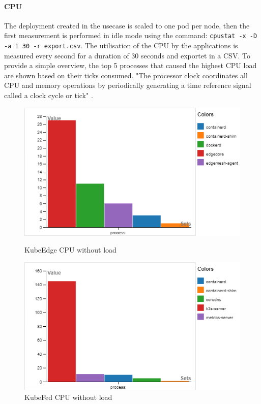 \documentclass[MIC,Master,english]{twbook}%
\begin{document}
\paragraph{CPU} The deployment created in the usecase is scaled to one pod per node, then the first measurement is performed in idle mode using the command: \lstinline|cpustat -x -D -a 1 30 -r export.csv|.
The utilisation of the CPU by the applications is measured every second for a duration of 30 seconds and exportet in a CSV. To provide a simple overview, the top 5 processes that caused the highest CPU load are shown based on their ticks consumed. "The processor clock coordinates all CPU and memory operations by periodically generating a time reference signal called a clock cycle or tick" \cite{pchwnut}.

\begin{figure}[ht]
    \centering
    \begin{minipage}[b]{.49\linewidth}
        \centering
        \includegraphics[width=\textwidth]{PICs/ke-cpu-noload.png}
        \caption{KubeEdge CPU without load}
    \end{minipage}
    \begin{minipage}[b]{.49\linewidth}
        \centering
        \includegraphics[width=\textwidth]{PICs/kf-cpu-noload.png}
        \caption{KubeFed CPU without load}
    \end{minipage}
    \label{fig:cpu-load-1}
\end{figure}
\end{document}

